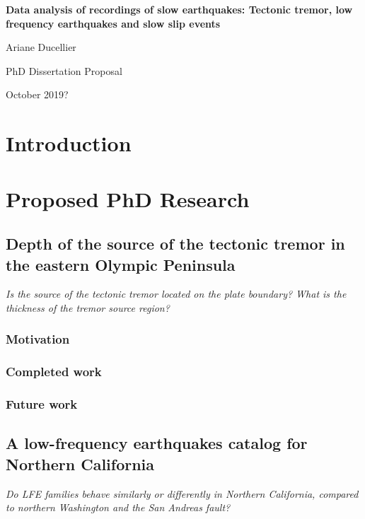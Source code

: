 \documentclass[letterpaper, 12pt]{article}
\begin{document}
\setcounter{page}{1}

\begin{center}

\textbf{Data analysis of recordings of slow earthquakes: Tectonic tremor, low frequency earthquakes and slow slip events}

\vspace{1em}

Ariane Ducellier

PhD Dissertation Proposal

October 2019?

\end{center}

\section{Introduction}

\section{Proposed PhD Research}

\subsection{Depth of the source of the tectonic tremor in the eastern Olympic Peninsula}

\textit{Is the source of the tectonic tremor located on the plate boundary? What is the thickness of the tremor source region?}

\subsubsection*{Motivation}

\subsubsection*{Completed work}

\subsubsection*{Future work}

\subsection{A low-frequency earthquakes catalog for Northern California}

\textit{Do LFE families behave similarly or differently in Northern California, compared to northern Washington and the San Andreas fault?}
\end{document}

